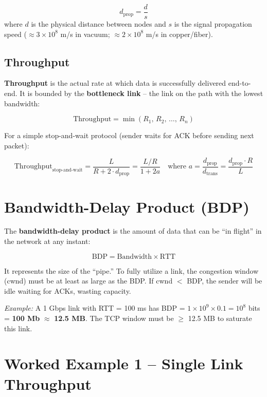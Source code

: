 \documentclass[11pt, letterpaper]{article}
\begin{document}
\[
  d_{\text{prop}} = \frac{d}{s}
\]
where $d$ is the physical distance between nodes and $s$ is the signal propagation speed ($\approx 3 \times 10^8$ m/s in vacuum; $\approx 2 \times 10^8$ m/s in copper/fiber).

\subsection*{Throughput}

\textbf{Throughput} is the actual rate at which data is successfully delivered end-to-end. It is bounded by the \textbf{bottleneck link} -- the link on the path with the lowest bandwidth:

\[
  \text{Throughput} = \min(R_1,\, R_2,\, \ldots,\, R_n)
\]

For a simple stop-and-wait protocol (sender waits for ACK before sending next packet):

\[
  \text{Throughput}_{\text{stop-and-wait}} = \frac{L}{R + 2 \cdot d_{\text{prop}}} = \frac{L / R}{1 + 2a}
  \quad \text{where } a = \frac{d_{\text{prop}}}{d_{\text{trans}}} = \frac{d_{\text{prop}} \cdot R}{L}
\]

\section*{Bandwidth-Delay Product (BDP)}

The \textbf{bandwidth-delay product} is the amount of data that can be ``in flight'' in the network at any instant:

\[
  \text{BDP} = \text{Bandwidth} \times \text{RTT}
\]

It represents the size of the ``pipe.'' To fully utilize a link, the congestion window (cwnd) must be at least as large as the BDP. If cwnd $<$ BDP, the sender will be idle waiting for ACKs, wasting capacity.

\textit{Example:} A 1 Gbps link with RTT = 100 ms has BDP = $1 \times 10^9 \times 0.1 = 10^8$ bits = \textbf{100 Mb} $\approx$ \textbf{12.5 MB}. The TCP window must be $\geq$ 12.5 MB to saturate this link.

\section*{Worked Example 1 -- Single Link Throughput}
\end{document}
